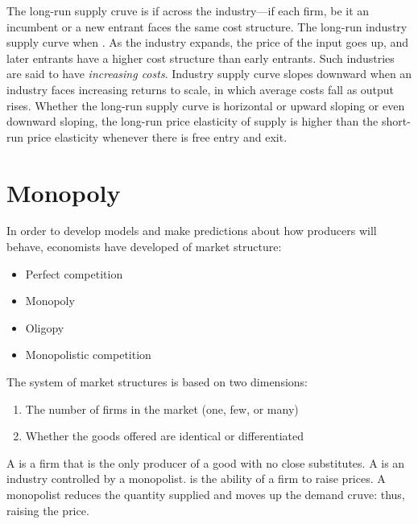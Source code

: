 \documentclass{article}
\begin{document}
The long-run supply cruve is  if  across the industry---if each firm, be it an incumbent or a new entrant faces the same cost structure. The long-run industry supply curve  when . As the industry expands, the price of the input goes up, and later entrants have a higher cost structure than early entrants. Such industries are said to have \emph{increasing costs}. Industry supply curve slopes downward when an industry faces increasing returns to scale, in which average costs fall as output rises. Whether the long-run supply curve is horizontal or upward sloping or even downward sloping, the long-run price elasticity of supply is higher than the short-run price elasticity whenever there is free entry and exit. 

\section{Monopoly}

In order to develop models and make predictions about how producers will behave, economists have developed  of market structure: 
\begin{itemize}
  \item Perfect competition 
  \item Monopoly 
  \item Oligopy
  \item Monopolistic competition
\end{itemize}

The system of market structures is based on two dimensions: 
\begin{enumerate}
  \item The number of firms in the market (one, few, or many) 
  \item Whether the goods offered are identical or differentiated
\end{enumerate}

A  is a firm that is the only producer of a good with no close substitutes. A  is an industry controlled by a monopolist.  is the ability of a firm to raise prices. A monopolist reduces the quantity supplied and moves up the demand cruve: thus, raising the price. \\ 
\end{document}
